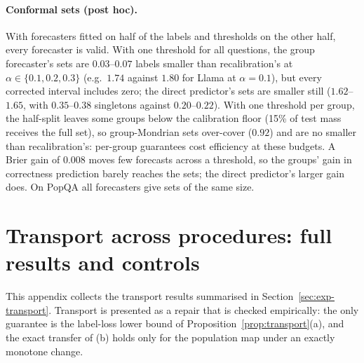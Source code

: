 \documentclass[11pt]{article}
\theoremstyle{definition}
\theoremstyle{remark}
\newcommand{\1}{\mathbf{1}}
\begin{document}
\paragraph{Conformal sets (post hoc).} With forecasters fitted on half of the labels and
thresholds on the other half, every forecaster is valid. With one threshold for all questions, the
group forecaster's sets are $0.03$--$0.07$ labels smaller than recalibration's at
$\alpha\in\{0.1,0.2,0.3\}$ (e.g.\ $1.74$ against $1.80$ for Llama at $\alpha=0.1$), but every corrected
interval includes zero; the direct predictor's sets are smaller still ($1.62$--$1.65$, with
$0.35$--$0.38$ singletons against $0.20$--$0.22$). With one threshold per group, the half-split leaves
some groups below the calibration floor (15\% of test mass receives the full set), so group-Mondrian
sets over-cover ($0.92$) and are no smaller than recalibration's: per-group guarantees cost efficiency
at these budgets. A Brier gain of $0.008$ moves few forecasts across a threshold, so the groups' gain in
correctness prediction barely reaches the sets; the direct predictor's larger gain does. On PopQA all
forecasters give sets of the same size.


\section{Transport across procedures: full results and controls}
\label{app:transport}
This appendix collects the transport results summarised in Section~\ref{sec:exp-transport}. Transport is
presented as a repair that is checked empirically: the only guarantee is the label-loss lower bound of
Proposition~\ref{prop:transport}(a), and the exact transfer of (b) holds only for the population map
under an exactly monotone change.
\end{document}
